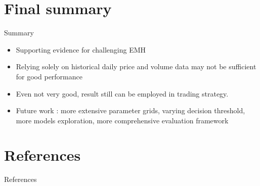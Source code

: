 \documentclass[aspectratio=169,t]{beamer} %
\begin{document}
\section{Final summary}
\begin{frame}{Summary}

\begin{itemize}
  \item Supporting evidence for challenging EMH
  \item Relying solely on historical daily price and volume data may not be sufficient for good performance
  \item Even not very good, result still can be employed in trading strategy.
  \item Future work : more extensive parameter grids, varying decision threshold, more models exploration, more comprehensive evaluation framework
  \end{itemize}
\end{frame}


\section{References}
\begin{frame}[allowframebreaks]{References}
\nocite{*}


\end{frame}
\end{document}
